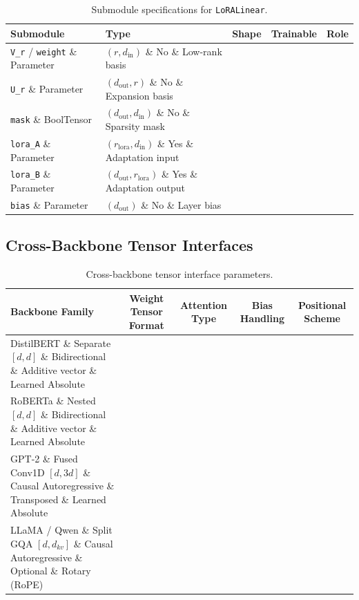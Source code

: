 \begin{table}[H]
\centering
\small
\begin{tabularx}{\linewidth}{llccX}
\toprule
\textbf{Submodule} & \textbf{Type} & \textbf{Shape} & \textbf{Trainable} & \textbf{Role} \\
\midrule
\texttt{V\_r} / \texttt{weight} \& Parameter & $(r, d_{\text{in}})$ \& No \& Low-rank basis \\
\texttt{U\_r} \& Parameter & $(d_{\text{out}}, r)$ \& No \& Expansion basis \\
\texttt{mask} \& BoolTensor & $(d_{\text{out}}, d_{\text{in}})$ \& No \& Sparsity mask \\
\texttt{lora\_A} \& Parameter & $(r_{\text{lora}}, d_{\text{in}})$ \& Yes \& Adaptation input \\
\texttt{lora\_B} \& Parameter & $(d_{\text{out}}, r_{\text{lora}})$ \& Yes \& Adaptation output \\
\texttt{bias} \& Parameter & $(d_{\text{out}})$ \& No \& Layer bias \\
\bottomrule
\end{tabularx}
\caption{Submodule specifications for \texttt{LoRALinear}.}
\label{tab:submodules_block\_transformer\_hiba}
\end{table}

\subsection{Cross-Backbone Tensor Interfaces}
\begin{table}[H]
\centering
\small
\begin{tabularx}{\linewidth}{lcccc}
\toprule
\textbf{Backbone Family} & \textbf{Weight Tensor Format} & \textbf{Attention Type} & \textbf{Bias Handling} & \textbf{Positional Scheme} \\
\midrule
DistilBERT \& Separate $[d, d]$ \& Bidirectional \& Additive vector \& Learned Absolute \\
RoBERTa \& Nested $[d, d]$ \& Bidirectional \& Additive vector \& Learned Absolute \\
GPT-2 \& Fused Conv1D $[d, 3d]$ \& Causal Autoregressive \& Transposed \& Learned Absolute \\
LLaMA / Qwen \& Split GQA $[d, d_{kv}]$ \& Causal Autoregressive \& Optional \& Rotary (RoPE) \\
\bottomrule
\end{tabularx}
\caption{Cross-backbone tensor interface parameters.}
\label{tab:backbone_interfaces}
\end{table}

